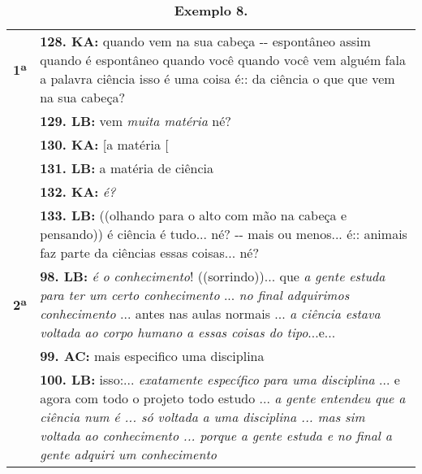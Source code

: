 \begin{table}[!t] %
	\centering
	\small
	\begin{threeparttable}
		\caption*{\textbf{Exemplo 8.} }
		\label{tab-09}
		\begin{tabular}{@{} 
				>{\raggedright\arraybackslash}p{} 
				>{\raggedright\arraybackslash}p{} @{}}
			\toprule\noalign{}
			\multirow{2}{*}{Luiza Bairros: compreensão de ciência}
			\linebreak
			\\
			\midrule\noalign{}
			
			\noalign{}
			
			
			\textbf{1ª } & \textbf{128. KA:} quando vem na sua cabeça -\/- espontâneo assim quando é espontâneo quando você quando você vem alguém fala a palavra ciência isso é uma coisa é:: da ciência o que que vem na sua cabeça? \\
			
			& \textbf{129. LB:} vem \emph{muita matéria} né? \\
			
			& \textbf{130. KA: }{[}a matéria {[} \\
			
			& \textbf{131. LB:} a matéria de ciência \\
			
			& \textbf{132. KA:} \emph{é?} \\
			
			& \textbf{133. LB:} ((olhando para o alto com mão na cabeça e pensando)) é ciência é tudo... né? -\/- mais ou menos... é:: animais faz parte da ciências essas coisas... né? \\
            \midrule
			
			\textbf{2ª } & \textbf{98. LB:} \emph{é o conhecimento}! ((sorrindo))... que \emph{a gente estuda para ter um certo conhecimento} ... \emph{no final adquirimos conhecimento} ... antes nas aulas normais ... \emph{a ciência estava voltada ao corpo humano a essas coisas do tipo}...e... \\
			
			& \textbf{99. AC:} mais especifico uma disciplina \\
			
			& \textbf{100. LB:} isso:... \emph{exatamente específico para uma disciplina} ... e agora com todo o projeto todo estudo ... \emph{a gente entendeu que a ciência num é ... só voltada a uma disciplina ... mas sim voltada ao conhecimento ... porque a gente estuda e no final a gente adquiri um conhecimento} \\
			\bottomrule
		\end{tabular}
	\end{threeparttable}
\end{table}
